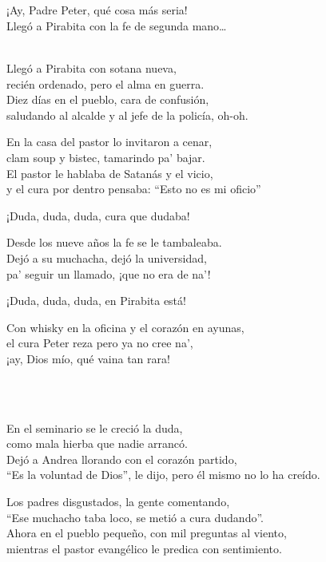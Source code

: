 \begin{lyrics}
\\
\\
¡Ay, Padre Peter, qué cosa más seria!\\
Llegó a Pirabita con la fe de segunda mano…

\\
Llegó a Pirabita con sotana nueva,\\
recién ordenado, pero el alma en guerra.\\
Diez días en el pueblo, cara de confusión,\\
saludando al alcalde y al jefe de la policía, oh-oh.

En la casa del pastor lo invitaron a cenar,\\
clam soup y bistec, tamarindo pa’ bajar.\\
El pastor le hablaba de Satanás y el vicio,\\
y el cura por dentro pensaba: “Esto no es mi oficio”

¡Duda, duda, duda, cura que dudaba!

Desde los nueve años la fe se le tambaleaba.\\
Dejó a su muchacha, dejó la universidad,\\
pa’ seguir un llamado, ¡que no era de na’!

¡Duda, duda, duda, en Pirabita está!

Con whisky en la oficina y el corazón en ayunas,\\
el cura Peter reza pero ya no cree na’,\\
¡ay, Dios mío, qué vaina tan rara!

\\
\\

En el seminario se le creció la duda,\\
como mala hierba que nadie arrancó.\\
Dejó a Andrea llorando con el corazón partido,\\
“Es la voluntad de Dios”, le dijo, pero él mismo no lo ha creído.

Los padres disgustados, la gente comentando,\\
“Ese muchacho taba loco, se metió a cura dudando”.\\
Ahora en el pueblo pequeño, con mil preguntas al viento,\\
mientras el pastor evangélico le predica con sentimiento.


\end{lyrics}
